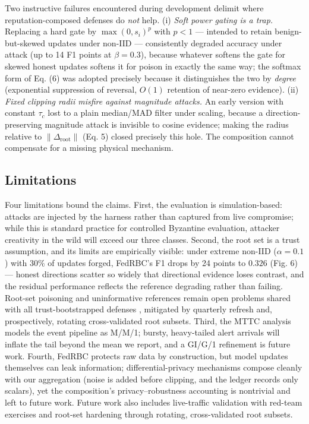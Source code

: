 \documentclass[cmc,article,submit,moreauthors,pdftex]{Definitions/tsp}
\begin{document}
Two instructive failures encountered during development delimit where reputation-composed defenses do \emph{not} help. (i) \emph{Soft power gating is a trap.} Replacing a hard gate by $\max(0, s_i)^p$ with $p < 1$ --- intended to retain benign-but-skewed updates under non-IID --- consistently degraded accuracy under attack (up to 14 F1 points at $\beta=0.3$), because whatever softens the gate for skewed honest updates softens it for poison in exactly the same way; the softmax form of Eq. (6) was adopted precisely because it distinguishes the two by \emph{degree} (exponential suppression of reversal, $O(1)$ retention of near-zero evidence). (ii) \emph{Fixed clipping radii misfire against magnitude attacks.} An early version with constant $\tau_c$ lost to a plain median/MAD filter under scaling, because a direction-preserving magnitude attack is invisible to cosine evidence; making the radius relative to $\|\Delta_{\mathrm{root}}\|$ (Eq. 5) closed precisely this hole. The composition cannot compensate for a missing physical mechanism.

\subsection{Limitations}\label{sec:limitations}

Four limitations bound the claims. First, the evaluation is simulation-based: attacks are injected by the harness rather than captured from live compromise; while this is standard practice for controlled Byzantine evaluation, attacker creativity in the wild will exceed our three classes. Second, the root set is a trust assumption, and its limits are empirically visible: under extreme non-IID ($\alpha=0.1$) with 30\% of updates forged, FedRBC's F1 drops by 24 points to $0.326$ (Fig. 6) --- honest directions scatter so widely that directional evidence loses contrast, and the residual performance reflects the reference degrading rather than failing. Root-set poisoning and uninformative references remain open problems shared with all trust-bootstrapped defenses \cite{ref-37}, mitigated by quarterly refresh and, prospectively, rotating cross-validated root subsets. Third, the MTTC analysis models the event pipeline as M/M/1; bursty, heavy-tailed alert arrivals will inflate the tail beyond the mean we report, and a GI/G/1 refinement is future work. Fourth, FedRBC protects raw data by construction, but model updates themselves can leak information; differential-privacy mechanisms \cite{ref-53,ref-54} compose cleanly with our aggregation (noise is added before clipping, and the ledger records only scalars), yet the composition's privacy--robustness accounting is nontrivial and left to future work. Future work also includes live-traffic validation with red-team exercises and root-set hardening through rotating, cross-validated root subsets.
\end{document}
